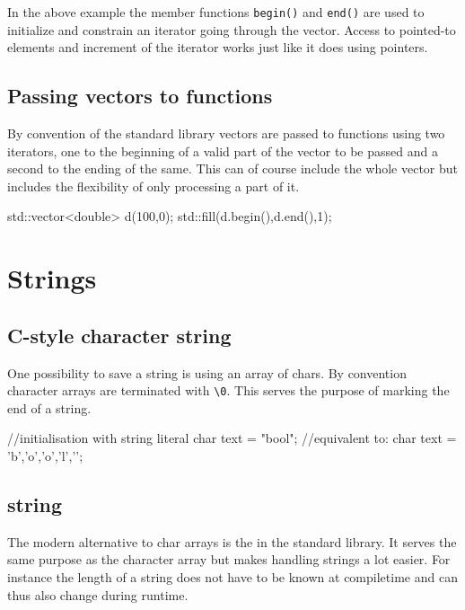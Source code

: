 \documentclass[10pt,a4paper]{scrartcl}
\begin{document}
\begin{multicols*}{2}
In the above example the member functions \verb+begin()+ and \verb+end()+ are used to initialize and constrain an iterator going through the vector. Access to pointed-to elements and increment of the iterator works just like it does using pointers.

\subsection{Passing vectors to functions}

By convention of the standard library vectors are passed to functions using two iterators, one to the beginning of a valid part of the vector to be passed and  a second to the ending of the same. This can of course include the whole vector but includes the flexibility of only processing a part of it.

\begin{TPCpp}
std::vector<double> d(100,0);
std::fill(d.begin(),d.end(),1);
\end{TPCpp}

\section{Strings}

\subsection{C-style character string}

One possibility to save a string is using an array of chars. By convention character arrays are terminated with \verb+\0+. This serves the purpose of marking the end of a string.

\begin{TPCpp}
//initialisation with string literal
char text = "bool";
//equivalent to:
char text = {'b','o','o','l','\0'};
\end{TPCpp}

\subsection{string}

The modern alternative to char arrays is the  in the standard library. It serves the same purpose as the character array but makes handling strings a lot easier. For instance the length of a string does not have to be known at compiletime and can thus also change during runtime.


\end{multicols*}
\end{document}
